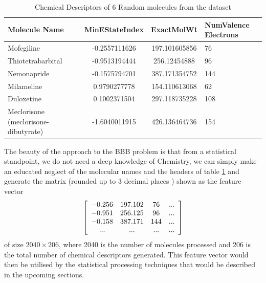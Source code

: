 \documentclass[a4paper,12pt]{report}
\begin{document}
					\begin{table}[ht!]
						\centering
						\begin{tabular}{ | p{3cm} | c | c | p{2cm} |   }
							\hline
							Molecule Name & MinEStateIndex & ExactMolWt & NumValence \newline Electrons \\
							\hline
							Mofegiline & -0.2557111626 & 197.101605856 & 76 \\
							\hline
							Thiotetrabarbital & -0.9513194444 & 256.12454888 & 96 \\
							\hline
							Nemonapride & -0.1575794701 & 387.171354752 & 144 \\
							\hline
							Milameline & 0.9790277778 & 154.110613068 & 62 \\
							\hline
							Duloxetine & 0.1002371504 & 297.118735228 & 108 \\
							\hline
							Meclorisone \newline(meclorisone-dibutyrate) & -1.6040011915 & 426.136464736 & 154 \\
							\hline
						\end{tabular}
						\caption{Chemical Descriptors of 6 Random molecules from the dataset}
						\label{table:random_chem_descriptors}
					\end{table}
				The beauty of the approach to the BBB problem is that from a statistical standpoint, we do not need a deep knowledge of Chemistry, we can simply make an educated neglect of the molecular names and the headers of table \ref{table:random_chem_descriptors} and generate the matrix (rounded up to 3 decimal places ) shown as the feature vector \label{matrix:samp_feat_vec}
				\[ \left[ \begin{array}{c c c c}
					-0.256 & 197.102 & 76 & ... \\
					-0.951 & 256.125 & 96 & ... \\
					-0.158 & 387.171 & 144 & ... \\
					... & ... & ... & ...
				\end{array}
				\right]\]
				of size $2040 \times 206$, where 2040 is the number of molecules processed and 206 is the total number of chemical descriptors generated. This feature vector would then be utilised by the statistical processing techniques that would be described in the upcoming sections.
\end{document}
